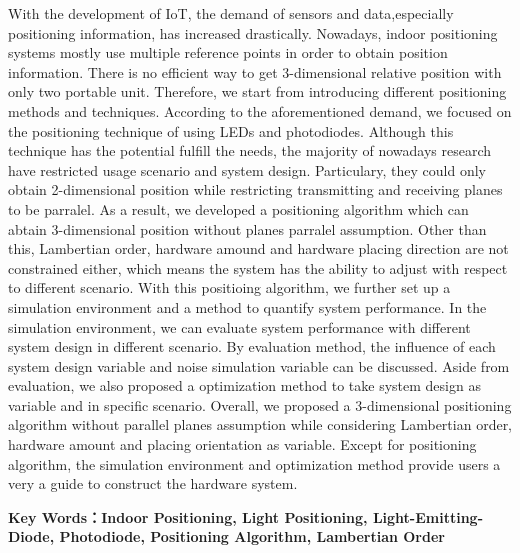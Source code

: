 \begin{abstractEN}

    With the development of IoT, the demand of sensors and data,especially positioning information, has increased drastically. Nowadays, indoor positioning systems mostly use multiple reference points in order to obtain position information. There is no efficient way to get 3-dimensional relative position with only two portable unit. Therefore, we start from introducing different positioning methods and techniques. According to the aforementioned demand, we focused on the positioning technique of using LEDs and photodiodes. Although this technique has the potential fulfill the needs, the majority of nowadays research have restricted usage scenario and system design. Particulary, they could only obtain 2-dimensional position while restricting transmitting and receiving planes to be parralel. As a result, we developed a positioning algorithm which can abtain 3-dimensional position without planes parralel assumption. Other than this, Lambertian order, hardware amound and hardware placing direction are not constrained either, which means the system has the ability to adjust with respect to different scenario. With this positioing algorithm, we further set up a simulation environment and a method to quantify system performance. In the simulation environment, we can evaluate system performance with different system design in different scenario. By evaluation method, the influence of each system design variable and noise simulation variable can be discussed. Aside from evaluation, we also proposed a optimization method to take system design as variable and in specific scenario. Overall, we proposed a 3-dimensional positioning algorithm without parallel planes assumption while considering Lambertian order, hardware amount and placing orientation as variable. Except for positioning algorithm, the simulation environment and optimization method provide users a very a guide to construct the hardware system. 

    \vspace{1cm}
    \noindent \textbf{Key Words：Indoor Positioning, Light Positioning, Light-Emitting-Diode, Photodiode, Positioning Algorithm, Lambertian Order}

\end{abstractEN}
